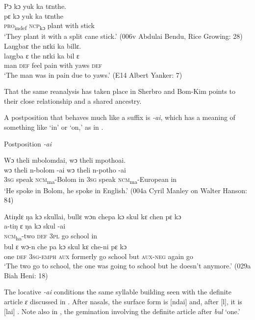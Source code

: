 	\ex Pɔ kɔ yuk ka tɛnthe.\\
	\gll pɛ      kɔ      yuk    ka      tɛnthe\\
	\textsc{pro}\textsubscript{indef}  \textsc{ncp}\textsubscript{kɔ}    plant    with    stick\\
 \glt ‘They plant it with a split cane stick.' (006v Abdulai Bendu, Rice Growing: 28)\\

	\ex Laŋgbaɛ the nɛki ka billɛ.\\
 \gll laŋgba  ɛ    the  nɛki  ka    bil    ɛ\\
	man    \textsc{def}  feel  pain  with  yaws  \textsc{def}\\
	\glt ‘The man was in pain due to yaws.' (E14 Albert Yanker: 7)
\z
\z
\z

That the same reanalysis has taken place in Sherbro and Bom-Kim points to their close relationship and a shared ancestry.

A postposition that behaves much like a suffix is \textit{{}-ai}, which has a meaning of something like ‘in' or ‘on,' as in .

\newpage
\ea%
    \label{ex:87}
    Postposition \textit{{}-ai}

  \ea \label{ex:87a} Wɔ theli mbolomdai, wɔ theli mpothoai.\\
  \gll wɔ    theli    n-bolom      {}-ai    wɔ    theli    n-potho        {}-ai\\
  \textsc{3sg}  speak    \textsc{ncm}\textsubscript{ma}{}-Bolom  in    \textsc{3sg}  speak    \textsc{ncm}\textsubscript{ma}{}-European  in\\
   \glt ‘He spoke in Bolom, he spoke in English.' (004a Cyril Manley on Walter Hanson: 84)

  \ex \label{ex:87b}  Atiŋdɛ ŋa kɔ skullai, bullɛ wɔn chepa kɔ skul kɛ chen pɛ kɔ\\
  \gll a-tiŋ      ɛ    ŋa    kɔ    skul    {}-ai\\
    \textsc{ncm}\textsubscript{ha}{}-two  \textsc{def}  \textsc{3pl}  go    school  in\\
  \gll bul  ɛ    wɔ{}-n      che  pa      kɔ    skul    kɛ    che-ni    pɛ      kɔ\\
  one  \textsc{def}  \textsc{3sg-emph}  \textsc{aux}  formerly  go    school  but  \textsc{aux-neg}  again    go\\
\glt ‘The two go to school, the one was going to school but he doesn't anymore.' (029a Biah Heni: 18)
\z
\z

The locative \textit{{}-ai} conditions the same syllable building seen with the definite article \textit{ɛ} discussed in . After nasals, the surface form is [ndai]  and, after [l], it is [lai] . Note also in , the gemination involving the definite article after \textit{bul} ‘one.'

